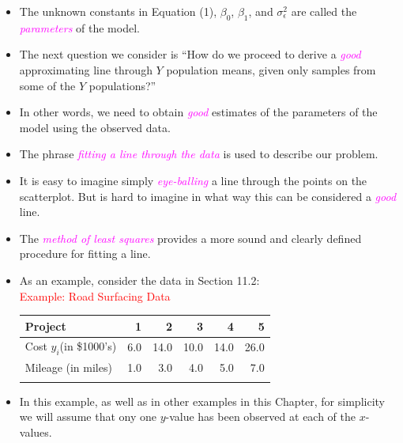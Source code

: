 \documentclass[xcolor=dvipsnames,12pt]{beamer}
\begin{document}
\begin{frame}
\begin{itemize}
\item The unknown constants in Equation (1), $\beta_0$, $\beta_1$, and   $\sigma_{\epsilon}^2$ are called the \textcolor{magenta}{\textit{parameters}} of the model.\\[.01in]
\item The next question we consider is ``How do we proceed to derive
a \textcolor{magenta}{\textit{good}} approximating line through $Y$ population means,
given only samples from some of the $Y$ populations?''\\[.01in]
\item  In other
words, we need to obtain \textcolor{magenta}{\textit{good}} estimates of the parameters 
of the model  using the  observed data.\\[.01in]
\item The phrase \textcolor{magenta}{\textit{fitting a line through the
data}} is used to describe our problem.\\[.01in]
\item It is easy to imagine simply \textcolor{magenta}{\textit{eye-balling}} a line through
the points on the scatterplot. But is  hard to imagine in what way this can be considered a \textcolor{magenta}{\textit{good}} line. 
\end{itemize}
\end{frame}




\begin{frame}
\begin{itemize}
\item The  \textcolor{magenta}{\textit{method of least squares}} provides
a more sound and clearly defined procedure for fitting a line.\\[.01in]  
\item As an example, consider
the data in Section 11.2:\\[.1in]
 \textcolor{red}{Example: Road Surfacing Data}\\[-.2in]
\begin{center}
\begin{tabular}{l|rrrrr}\hline
Project & 1 & 2 & 3 & 4 & 5 \\ \hline
Cost $y_i$(in \$1000's) & 6.0 & 14.0 & 10.0 & 14.0 & 26.0  \\
Mileage (in miles) & 1.0 & 3.0 & 4.0 & 5.0 & 7.0 \\\hline \\[.01in]
\end{tabular}
\end{center}
\item In this example, as well as in other examples in this Chapter,
for simplicity we will assume that ony one
$y$-value has been observed at each of the $x$-values.
\end{itemize}
\end{frame}
\end{document}
